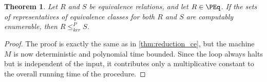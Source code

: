 \documentclass{article}
\newtheorem{theorem}{Theorem}[section]
\theoremstyle{definition} \newtheorem{definition}[definition]{Definition}
\newcommand{\sigmastar}{\{0, 1\}^{*}} %
\newcommand{\kr}{\leq^{P}_{ker}} %
\newcommand{\pair}[2]{\langle#1,#2\rangle} %
\begin{document}
\begin{theorem}
  Let $R$ and $S$ be equivalence relations, and let $R\in\PEq$. If the sets of
  representatives of equivalence classes for both $R$ and $S$ are computably
  enumerable, then $R\kr S$.
\end{theorem}
\begin{proof}
  The proof is exactly the same as in \autoref{thm:reduction_ce}, but the
  machine $M$ is now deterministic and polynomial time bounded. Since the loop
  always halts but is independent of the input, it contributes only a
  multiplicative constant to the overall running time of the procedure.
\end{proof}




\end{document}
